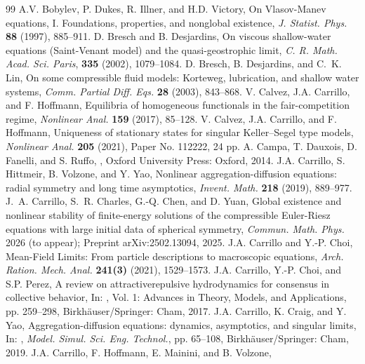 \documentclass[reqno,11pt]{amsart}
\numberwithin{equation}{section}
\theoremstyle{definition}
\begin{document}
\begin{thebibliography}{99}
A.V. Bobylev, P. Dukes, R. Illner, and H.D. Victory, On Vlasov-Manev equations, 
I. Foundations, properties, and nonglobal existence,
{\em J. Statist. Phys.} {\bf 88} (1997), 885--911.
 D. Bresch and B. Desjardins,
 On viscous shallow-water equations (Saint-Venant model) and the quasi-geostrophic limit,
 {\it C. R. Math. Acad. Sci. Paris}, {\bf 335} (2002), 1079--1084.
 D. Bresch, B. Desjardins, and C.~K. Lin,
 On some compressible fluid models: Korteweg, lubrication, and shallow water systems,
 {\it Comm. Partial Diff. Eqs.} {\bf 28} (2003), 843--868.
V. Calvez, J.A. Carrillo, and F. Hoffmann,
Equilibria of homogeneous functionals in the fair-competition regime, 
{\it Nonlinear Anal.} {\bf 159} (2017), 85--128.
V. Calvez, J.A. Carrillo, and F. Hoffmann,
Uniqueness of stationary states for singular Keller--Segel type
models, {\it Nonlinear Anal.} {\bf 205} (2021), Paper No. 112222, 24 pp.
A. Campa, T. Dauxois, D. Fanelli, and S. Ruffo, 
, 
Oxford University Press: Oxford, 2014.
 J.A. Carrillo, S. Hittmeir,  B. Volzone, and Y. Yao, 
 Nonlinear aggregation-diffusion equations: radial symmetry and long time asymptotics, 
 {\em Invent. Math.} {\bf 218} (2019), 889--977.
 J.~A. Carrillo, S.~R. Charles, G.-Q. Chen, and D. Yuan,
 Global existence and nonlinear stability of finite-energy solutions of the compressible Euler-Riesz equations with large initial data of spherical symmetry, {\em Commun. Math. Phys.} 2026 (to appear); Preprint arXiv:2502.13094,
 2025.
 J.A. Carrillo and Y.-P. Choi, Mean-Field Limits: From particle descriptions to macroscopic equations, 
 {\em Arch. Ration. Mech. Anal.} {\bf 241(3)} (2021), 1529--1573.
 J.A. Carrillo, Y.-P. Choi, and S.P. Perez, A review on attractive{\textendash}repulsive 
 hydrodynamics for consensus in collective behavior, In: , Vol. 1: 
 Advances in Theory, Models, and Applications, pp. 259--298,  Birkh\"{a}user/Springer: Cham, 2017.
J.A. Carrillo, K. Craig, and Y. Yao,  
Aggregation-diffusion equations: dynamics, asymptotics, and singular limits, 
In: , {\em Model. Simul. Sci. Eng. Technol.}, pp. 65--108, Birkh\"auser/Springer: Cham, 2019.
 J.A. Carrillo, F. Hoffmann, E. Mainini, and B. Volzone, 

\end{thebibliography}
\end{document}
